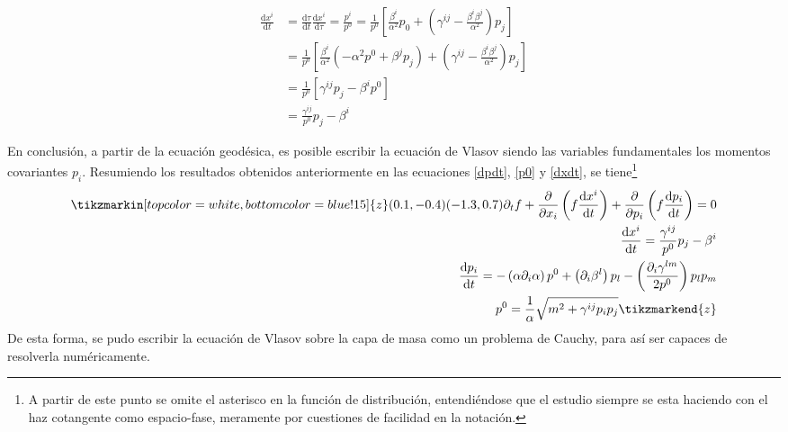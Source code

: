 \documentclass[11pt,twoside,openright,spanish]{report}
\numberwithin{equation}{chapter}
\numberwithin{figure}{chapter}
\numberwithin{table}{chapter}
\begin{document}
\begin{align}
\nonumber
\frac{\text{d}x^i}{\text{d}t}&=\frac{\text{d}\tau}{\text{d}t}\frac{\text{d}x^i}{\text{d}\tau}=\frac{p^i}{p^0}=\frac{1}{p^0}\left[\frac{\beta^i}{\alpha^2}p_0+\left(\gamma^{ij}-\frac{\beta^i\beta^j}{\alpha^2}\right)p_j\right]\\
\nonumber
&=\frac{1}{p^0}\left[\frac{\beta^i}{\alpha^2}\left(-\alpha^2p^0+\beta^jp_j\right)+\left(\gamma^{ij}-\frac{\beta^i\beta^j}{\alpha^2}\right)p_j\right]\\
\nonumber
&=\frac{1}{p^0}\left[\gamma^{ij}p_j-\beta^ip^0\right]\\
&=\frac{\gamma^{ij}}{p^0}p_j-\beta^i\label{dxdt}
\end{align}


En conclusión, a partir de la ecuación geodésica, es posible escribir la ecuación de Vlasov siendo las variables fundamentales los momentos covariantes $p_i$. Resumiendo los resultados obtenidos anteriormente en las ecuaciones \eqref{dpdt}, \eqref{p0} y \eqref{dxdt}, se tiene\footnote{A partir de este punto se omite el asterisco en la función de distribución, entendiéndose que el estudio siempre se esta haciendo con el haz cotangente como espacio-fase, meramente por cuestiones de facilidad en la notación.}
\begin{subequations}
\begin{align}
\tikzmarkin[top color=white, bottom color=blue!15]{z}(0.1,-0.4)(-1.3,0.7)
\partial_t f+\frac{\partial}{\partial x_i}\left(f\frac{\text{d}x^i}{\text{d}t}\right)+\frac{\partial}{\partial p_i}\left(f\frac{\text{d}p_i}{\text{d}t}\right)=0\label{sisvlasov1}\\
\frac{\text{d}x^i}{\text{d}t}=\frac{\gamma^{ij}}{p^0}p_j-\beta^i\\
\frac{\text{d}p_i}{\text{d}t}=-\left(\alpha\partial_i \alpha\right)p^0+\left(\partial_i \beta^l\right)p_l-\left(\frac{\partial_i \gamma^{lm}}{2p^0}\right)p_l p_m\\
p^0=\frac{1}{\alpha}\sqrt{m^2+\gamma^{ij}p_ip_j}
\tikzmarkend{z}
\end{align}\label{sisvlasov}
\end{subequations}
De esta forma, se pudo escribir la ecuación de Vlasov sobre la capa de masa como un problema de Cauchy, para así ser capaces de resolverla numéricamente.
\end{document}
